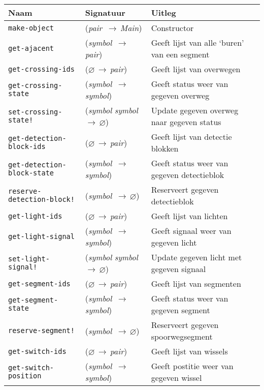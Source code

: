 \documentclass[a4paper, 11pt]{article}
\newcommand{\naar}{\,$\rightarrow$\,}
\renewcommand{\empty}{$\varnothing$}
\newcommand{\<}{\scriptsize\textless\normalsize}
\renewcommand{\>}{\scriptsize\textgreater\normalsize}
\begin{document}
\begin{table}[H]
	\begin{center}
		\begin{tabular}{|l l l|}
			\hline
			\textbf{Naam} & \textbf{Signatuur} & \textbf{Uitleg}\\
			\hline
			\texttt{make-object} & (\textit{pair} \naar \textit{Main}) & Constructor\\
			\hline
			\texttt{get-ajacent} & (\textit{symbol} \naar \textit{pair}) & Geeft lijst van alle \lq buren' van een segment\\
			\texttt{get-crossing-ids} & (\empty \naar \textit{pair}) & Geeft lijst van overwegen\\
			\texttt{get-crossing-state} & (\textit{symbol} \naar \textit{symbol}) & Geeft status weer van gegeven overweg\\
			\texttt{set-crossing-state!} & (\textit{symbol} \textit{symbol} \naar \empty) & Update gegeven overweg naar gegeven status\\
			\texttt{get-detection-block-ids} & (\empty \naar \textit{pair}) & Geeft lijst van detectie blokken\\
			\texttt{get-detection-block-state} & (\textit{symbol} \naar \textit{symbol}) & Geeft status weer van gegeven detectieblok\\
			\texttt{reserve-detection-block!} & (\textit{symbol} \naar \empty) & Reserveert gegeven detectieblok\\
			\texttt{get-light-ids} & (\empty \naar \textit{pair}) & Geeft lijst van lichten\\
			\texttt{get-light-signal} & (\textit{symbol} \naar \textit{symbol}) & Geeft signaal weer van gegeven licht\\
			\texttt{set-light-signal!} & (\textit{symbol} \textit{symbol} \naar \empty) & Update gegeven licht met gegeven signaal\\
			\texttt{get-segment-ids} & (\empty \naar \textit{pair}) & Geeft lijst van segmenten\\
			\texttt{get-segment-state} & (\textit{symbol} \naar \textit{symbol}) & Geeft status weer van gegeven segment\\
			\texttt{reserve-segment!} & (\textit{symbol} \naar \empty) & Reserveert gegeven spoorwegsegment\\
			\texttt{get-switch-ids} & (\empty \naar \textit{pair}) & Geeft lijst van wissels\\
			\texttt{get-switch-position} & (\textit{symbol} \naar \textit{symbol}) & Geeft postitie weer van gegeven wissel\\

\end{tabular}
\end{center}
\end{table}
\end{document}
